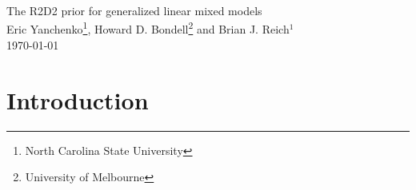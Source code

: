 \documentclass[12pt]{article}
\begin{document}
\begin{center}
{\Large The R2D2 prior for generalized linear mixed models}\\\vspace{6pt}
{\large Eric Yanchenko\footnote[1]{North Carolina State University}, Howard D. Bondell\footnote[2]{ University of Melbourne} and Brian J. Reich$^1$}\\
\today
\end{center}

\begin{abstract}
\noindent
In Bayesian analysis, the selection of a prior distribution is typically done by considering each parameter in the model. While this can be convenient, in many scenarios it may be desirable to place a prior on a summary measure of the model instead. In this work, we propose a prior on the model fit, as measured by a Bayesian coefficient of determination ($R^2)$, which then induces a prior on the individual parameters. We achieve this by placing a beta prior on $R^2$ and then deriving the induced prior on the global variance parameter for generalized linear mixed models. We derive closed-form expressions in many scenarios and present several approximation strategies when an analytic form is not possible and/or to allow for easier computation. In these situations, we suggest approximating the prior by using a generalized beta prime distribution and provide a simple default prior construction scheme. This approach is quite flexible and can be easily implemented in standard Bayesian software. Lastly, we demonstrate the performance of the method on simulated and real-world data, where the method particularly shines in high-dimensional settings, as well as modeling random effects.

Bayesian modeling, Coefficient of determination, Generalized beta prime distribution, Goodness-of-fit
\end{abstract}


\section{Introduction}\label{s:intro}
\end{document}
